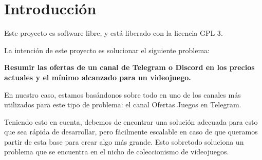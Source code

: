 \chapter{Introducción}

Este proyecto es software libre, y está liberado con la licencia GPL 3\cite{gplv3}.

La intención de este proyecto es solucionar el siguiente problema:

\textbf{Resumir las ofertas de un canal de Telegram o Discord en los precios actuales y el mínimo alcanzado para un videojuego.}

En nuestro caso, estamos basándonos sobre todo en uno de los canales más utilizados para este tipo de problema: el canal Ofertas Juegos en Telegram.

Teniendo esto en cuenta, debemos de encontrar una solución adecuada para esto que sea rápida de desarrollar, pero fácilmente escalable en
caso de que queramos partir de esta base para crear algo más grande. Esto sobretodo soluciona un problema que se encuentra en el nicho de coleccionismo
de videojuegos.

